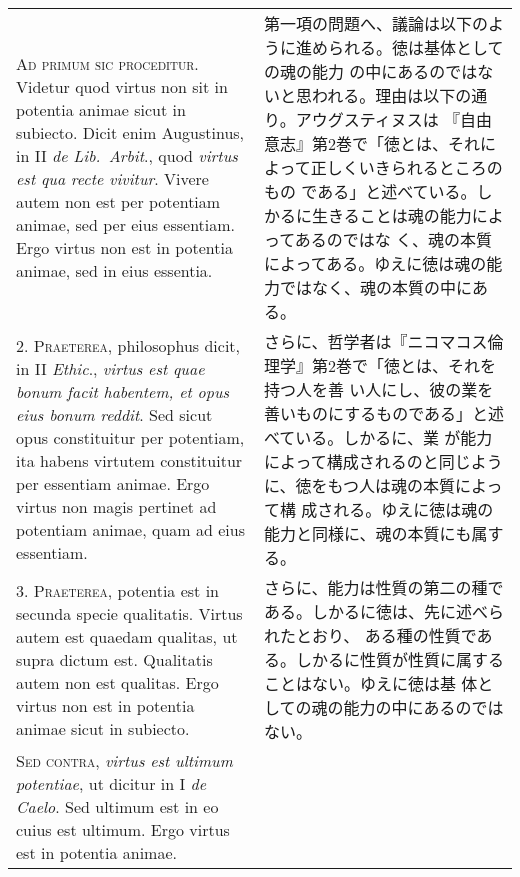 \documentclass[10pt]{jsarticle}
\begin{document}
\begin{longtable}{p{21em}p{21em}}
{\scshape Ad primum sic proceditur}. Videtur quod virtus non sit in
potentia animae sicut in subiecto. Dicit enim Augustinus, in II
{\itshape de Lib.~Arbit}., quod {\itshape virtus est qua recte
vivitur}. Vivere autem non est per potentiam animae, sed per eius
essentiam. Ergo virtus non est in potentia animae, sed in eius
essentia.

&

第一項の問題へ、議論は以下のように進められる。徳は基体としての魂の能力
の中にあるのではないと思われる。理由は以下の通り。アウグスティヌスは
『自由意志』第2巻で「徳とは、それによって正しくいきられるところのもの
である」と述べている。しかるに生きることは魂の能力によってあるのではな
く、魂の本質によってある。ゆえに徳は魂の能力ではなく、魂の本質の中にあ
る。

\\



2. {\scshape Praeterea}, philosophus dicit, in II {\itshape Ethic}.,
{\itshape virtus est quae bonum facit habentem, et opus eius bonum
reddit}. Sed sicut opus constituitur per potentiam, ita habens
virtutem constituitur per essentiam animae. Ergo virtus non magis
pertinet ad potentiam animae, quam ad eius essentiam.

&

さらに、哲学者は『ニコマコス倫理学』第2巻で「徳とは、それを持つ人を善
い人にし、彼の業を善いものにするものである」と述べている。しかるに、業
が能力によって構成されるのと同じように、徳をもつ人は魂の本質によって構
成される。ゆえに徳は魂の能力と同様に、魂の本質にも属する。

\\



3. {\scshape Praeterea}, potentia est in secunda specie
qualitatis. Virtus autem est quaedam qualitas, ut supra dictum
est. Qualitatis autem non est qualitas. Ergo virtus non est in
potentia animae sicut in subiecto.

&

さらに、能力は性質の第二の種である。しかるに徳は、先に述べられたとおり、
ある種の性質である。しかるに性質が性質に属することはない。ゆえに徳は基
体としての魂の能力の中にあるのではない。

\\

{\scshape Sed contra}, {\itshape virtus est ultimum potentiae}, ut
dicitur in I {\itshape de Caelo}. Sed ultimum est in eo cuius est
ultimum. Ergo virtus est in potentia animae.


\end{longtable}
\end{document}
